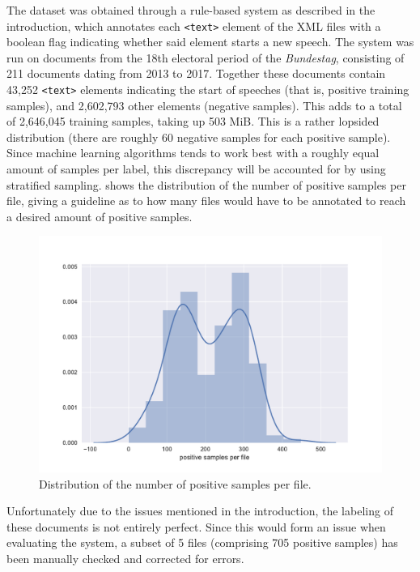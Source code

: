 The dataset was obtained through a rule-based system as described in the
introduction, which annotates each \texttt{<text>} element of the XML files with
a boolean flag indicating whether said element starts a new speech. The system
was run on documents from the 18th electoral period of the \emph{Bundestag},
consisting of 211 documents dating from 2013 to 2017. Together these documents
contain 43,252 \texttt{<text>} elements indicating the start of speeches (that
is, positive training samples), and 2,602,793 other elements (negative samples).
This adds to a total of 2,646,045 training samples, taking up 503 MiB. This is a
rather lopsided distribution (there are roughly 60 negative samples for each
positive sample). Since machine learning algorithms tends to work best with a
roughly equal amount of samples per label, this discrepancy will be accounted
for by using stratified sampling.  shows the distribution of
the number of positive samples per file, giving a guideline as to how many files
would have to be annotated to reach a desired amount of positive samples.
\begin{figure}[tb]
  \centering
  \includegraphics[width=\textwidth]{figures/distribution.pdf}
  \caption{Distribution of the number of positive samples per
    file.\label{fig:data_dist}}
\end{figure}
Unfortunately due to the issues mentioned in the introduction, the labeling of
these documents is not entirely perfect. Since this would form an issue when
evaluating the system, a subset of 5 files (comprising 705 positive samples) has
been manually checked and corrected for errors.

